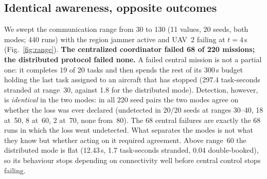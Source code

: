 \documentclass[conference]{IEEEtran}
\begin{document}
\subsection{Identical awareness, opposite outcomes}
\label{sec:awareness}

We swept the communication range from 30 to 130 (11 values, 20 seeds, both
modes; 440 runs) with the region jammer active and UAV~2 failing at $t=4$\,s
(Fig.~\ref{fig:range}). \textbf{The centralized coordinator failed 68 of 220
missions; the distributed protocol failed none.} A failed central mission is
not a partial one: it completes 19 of 20 tasks and then spends the rest of its
300\,s budget holding the last task assigned to an aircraft that has stopped
(297.4 task-seconds stranded at range~30, against 1.8 for the distributed
mode).
Detection, however, is \emph{identical} in the two modes: in all 220 seed
pairs the two modes agree on whether the loss was ever declared (undetected
in 20/20 seeds at ranges 30--40, 18 at~50, 8 at~60, 2 at~70, none from~80).
The 68 central failures are exactly the 68 runs in which the loss went
undetected. What separates the modes is not what they know but whether acting
on it required agreement. Above range~60 the
distributed mode is flat (12.43\,s, 1.7 task-seconds stranded, 0.04
double-booked), so its behaviour stops depending on connectivity well before
central control stops failing.
\end{document}
